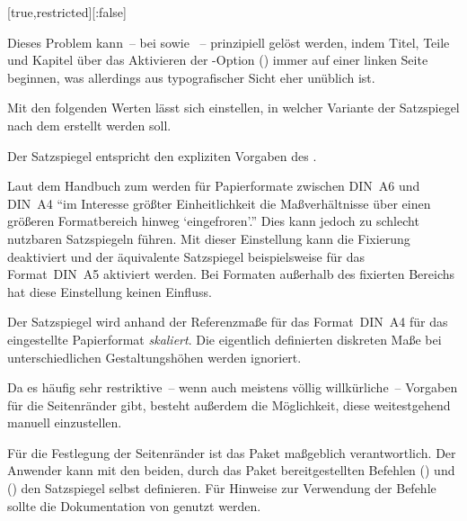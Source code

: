 \begin{Declaration*}{}
\begin{Declaration*}{}
\begin{Declaration*}{}
\begin{Declaration}[%
  v2.03;
  v2.05!\Option{cdgeometry=restricted};%
  v2.05!\Option{cdgeometry=adapted};%
  v2.05!\Option{cdgeometry=calculated};%
  v2.05!\Option{cdgeometry=custom};%
]{}[true,restricted][:false]
\begin{values}{}
  Dieses Problem kann~-- bei  sowie ~-- 
  prinzipiell gelöst werden, indem Titel, Teile und Kapitel über das Aktivieren 
  der \KOMAScript-Option () immer auf 
  einer linken Seite beginnen, was allerdings aus typografischer Sicht eher 
  unüblich ist.
\end{values}
%
Mit den folgenden Werten lässt sich einstellen, in welcher Variante der 
Satzspiegel nach dem \TUDCD erstellt werden soll. 
%
\begin{values}{}
\item[restricted]
  Der Satzspiegel entspricht den expliziten Vorgaben des \CDs.
\item[adapted]
  Laut dem Handbuch zum \CD werden für Papierformate zwischen DIN~A6 und DIN~A4 
  \enquote{im Interesse größter Einheitlichkeit die Maßverhältnisse über einen 
  größeren Formatbereich hinweg \enquote{eingefroren}.} Dies kann jedoch zu 
  schlecht nutzbaren Satzspiegeln führen. Mit dieser Einstellung kann die 
  Fixierung deaktiviert und der äquivalente Satzspiegel beispielsweise für das 
  Format~DIN~A5 aktiviert werden. Bei Formaten außerhalb des fixierten Bereichs 
  hat diese Einstellung keinen Einfluss. 
\item[calculated]
  Der Satzspiegel wird anhand der Referenzmaße für das Format~DIN~A4 für das 
  eingestellte Papierformat \emph{skaliert}. Die eigentlich definierten 
  diskreten Maße bei unterschiedlichen Gestaltungshöhen werden ignoriert.
\end{values}
%
Da es häufig sehr restriktive~-- wenn auch meistens völlig willkürliche~-- 
Vorgaben für die Seitenränder gibt, besteht außerdem die Möglichkeit, diese 
weitestgehend manuell einzustellen. 
\begin{values}{}
\item[custom]
  Für die Festlegung der Seitenränder ist das Paket  
  maßgeblich verantwortlich. Der Anwender kann mit den beiden, durch das Paket 
  bereitgestellten Befehlen () und 
  () den Satzspiegel selbst definieren. 
  Für Hinweise zur Verwendung der Befehle sollte die Dokumentation von 
   genutzt werden.
\end{values}
\end{Declaration}


\end{Declaration*}
\end{Declaration*}
\end{Declaration*}
